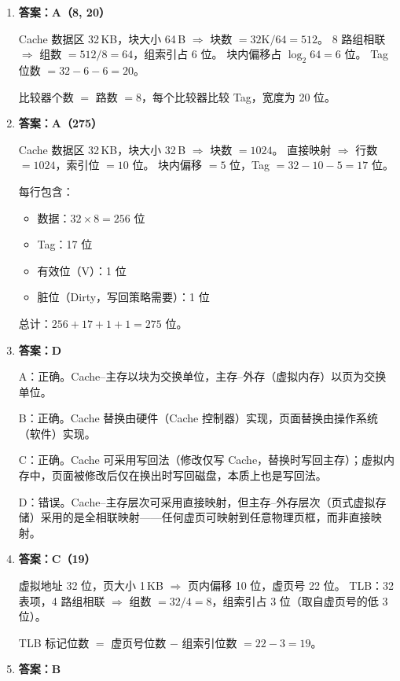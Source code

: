 \documentclass[12pt,a4paper]{ctexart}
\begin{document}
\begin{enumerate}[leftmargin=*]
即 01\,8840H，选 C。

\item \textbf{答案：A（8, 20）}

Cache 数据区 32\,KB，块大小 64\,B $\Rightarrow$ 块数 $= 32\mathrm{K}/64 = 512$。
8 路组相联 $\Rightarrow$ 组数 $= 512/8 = 64$，组索引占 6 位。
块内偏移占 $\log_2 64 = 6$ 位。
Tag 位数 $= 32 - 6 - 6 = 20$。

比较器个数 $=$ 路数 $= 8$，每个比较器比较 Tag，宽度为 20 位。

\item \textbf{答案：A（275）}

Cache 数据区 32\,KB，块大小 32\,B $\Rightarrow$ 块数 $= 1024$。
直接映射 $\Rightarrow$ 行数 $= 1024$，索引位 $= 10$ 位。
块内偏移 $= 5$ 位，Tag $= 32 - 10 - 5 = 17$ 位。

每行包含：
\begin{itemize}
\item 数据：$32 \times 8 = 256$ 位
\item Tag：17 位
\item 有效位（V）：1 位
\item 脏位（Dirty，写回策略需要）：1 位
\end{itemize}

总计：$256 + 17 + 1 + 1 = 275$ 位。

\item \textbf{答案：D}

A：正确。Cache--主存以块为交换单位，主存--外存（虚拟内存）以页为交换单位。

B：正确。Cache 替换由硬件（Cache 控制器）实现，页面替换由操作系统（软件）实现。

C：正确。Cache 可采用写回法（修改仅写 Cache，替换时写回主存）；虚拟内存中，页面被修改后仅在换出时写回磁盘，本质上也是写回法。

D：错误。Cache--主存层次可采用直接映射，但主存--外存层次（页式虚拟存储）采用的是全相联映射——任何虚页可映射到任意物理页框，而非直接映射。

\item \textbf{答案：C（19）}

虚拟地址 32 位，页大小 1\,KB $\Rightarrow$ 页内偏移 10 位，虚页号 22 位。
TLB：32 表项，4 路组相联 $\Rightarrow$ 组数 $= 32/4 = 8$，组索引占 3 位（取自虚页号的低 3 位）。

TLB 标记位数 $=$ 虚页号位数 $-$ 组索引位数 $= 22 - 3 = 19$。

\item \textbf{答案：B}


\end{enumerate}
\end{document}
